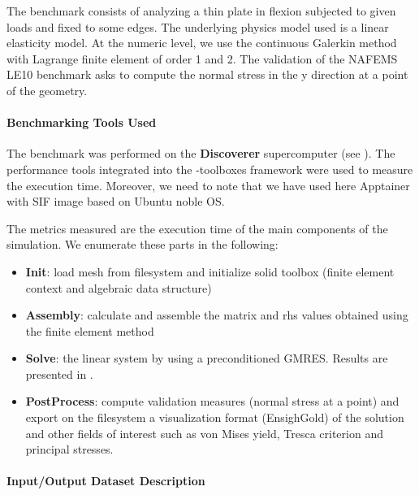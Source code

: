 The benchmark consists of analyzing a thin plate in flexion subjected to given
loads and fixed to some edges. The underlying physics model used is a linear
elasticity model. At the numeric level, we use the continuous Galerkin method
with Lagrange finite element of order 1 and 2. The validation of the NAFEMS LE10
benchmark asks to compute the normal stress in the y direction at a point of the geometry.


\paragraph{Benchmarking Tools Used}
The benchmark was performed on the \textbf{Discoverer} supercomputer (see
).
The performance tools integrated into the \Feelpp-toolboxes framework were used to measure
the execution time.
Moreover, we need to note that we have used here Apptainer with \Feelpp SIF image based on Ubuntu noble OS.

The metrics measured are the execution time of the main components of the simulation. We enumerate these parts in the following:
\begin{itemize}
\item \textbf{Init}: load mesh from filesystem and initialize solid toolbox (finite element context and algebraic data structure)
\item \textbf{Assembly}: calculate and assemble the matrix and rhs values obtained using the finite element method
\item \textbf{Solve}: the linear system by using a preconditioned GMRES. Results
  are presented in .
\item \textbf{PostProcess}: compute validation measures (normal stress at a point)
  and export on the filesystem a visualization format (EnsighGold) of the
  solution and other fields of interest such as von Mises yield, Tresca criterion and
  principal stresses.
\end{itemize}

\paragraph{Input/Output Dataset Description}

